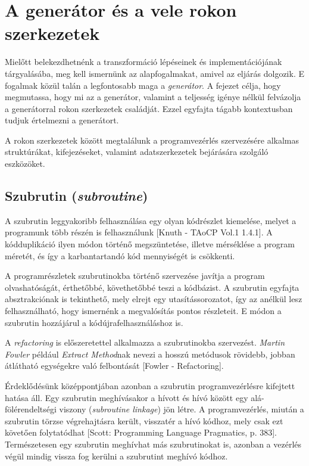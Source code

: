 \chapter{A generátor és a vele rokon szerkezetek}

Mielőtt belekezdhetnénk a transzformáció lépéseinek és implementációjának tárgyalásába, meg kell ismernünk az alapfogalmakat, amivel az eljárás dolgozik. E fogalmak közül talán a legfontosabb maga a \textit{generátor}. A fejezet célja, hogy megmutassa, hogy mi az a generátor, valamint a teljesség igénye nélkül felvázolja a generátorral rokon szerkezetek családját. Ezzel egyfajta tágabb kontextusban tudjuk értelmezni a generátort.

A rokon szerkezetek között megtalálunk a programvezérlés szervezésére alkalmas struktúrákat, kifejezéseket, valamint adatszerkezetek bejárására szolgáló eszközöket.

\section{Szubrutin (\textit{subroutine})}

A szubrutin leggyakoribb felhasználása egy olyan kódrészlet kiemelése, melyet a programunk több részén is felhasználunk [Knuth - TAoCP Vol.1 1.4.1]. A kódduplikáció ilyen módon történő megszüntetése, illetve mérséklése a program méretét, és így a karbantartandó kód mennyiségét is csökkenti. 

A programrészletek szubrutinokba történő szervezése javítja a program olvashatóságát, érthetőbbé, követhetőbbé teszi a kódbázist. A szubrutin egyfajta absztrakciónak is tekinthető, mely elrejt egy utasítássorozatot, így az anélkül lesz felhasználható, hogy ismernénk a megvalósítás pontos részleteit. E módon a szubrutin hozzájárul a kódújrafelhasználáshoz is.

A \textit{refactoring} is előszeretettel alkalmazza a szubrutinokba szervezést. \textit{Martin Fowler} például \textit{Extract Method}nak nevezi a hosszú metódusok rövidebb, jobban átlátható egységekre való felbontását [Fowler - Refactoring].

Érdeklődésünk középpontjában azonban a szubrutin programvezérlésre kifejtett hatása áll. Egy szubrutin meghívásakor a hívott és hívó között egy alá-fölérendeltségi viszony (\textit{subroutine linkage}) jön létre. A programvezérlés, miután a szubrutin törzse végrehajtásra került, visszatér a hívó kódhoz, mely csak ezt követően folytatódhat [Scott: Programming Language Pragmatics, p. 383]. Természetesen egy szubrutin meghívhat más szubrutinokat is, azonban a vezérlés végül mindig vissza fog kerülni a szubrutint meghívó kódhoz.

